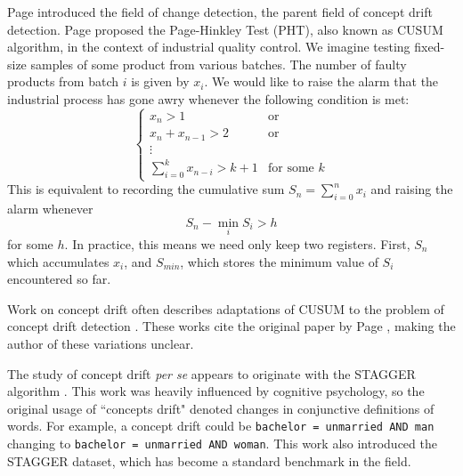 Page \cite{CUSUM} introduced the field of change detection, the parent field of concept drift detection. Page proposed the Page-Hinkley Test (PHT), also known as CUSUM algorithm, in the context of industrial quality control. We imagine testing fixed-size samples of some product from various batches. The number of faulty products from batch $i$ is given by $x_i$. We would like to raise the alarm that the industrial process has gone awry whenever the following condition is met:
\begin{equation}
    \begin{cases}
        x_n > 1 & \text{or} \\
        x_n + x_{n-1} > 2 & \text{or} \\
        \vdots \\
        \sum_{i=0}^k x_{n-i} > k + 1 & \text{for some $k$}
    \end{cases}
\end{equation}
This is equivalent to recording the cumulative sum $S_n = \sum_{i=0}^n x_i$ and raising the alarm whenever
\begin{equation}
    S_n - \min_{i} S_i > h
\end{equation}
for some $h$. In practice, this means we need only keep two registers. First, $S_n$ which accumulates $x_i$, and $S_{min}$, which stores the minimum value of $S_i$ encountered so far.


Work on concept drift often describes adaptations of CUSUM to the problem of concept drift detection \cite{barros_comparison}\cite{gama_survey}. These works cite the original paper by Page \cite{CUSUM}, making the author of these variations unclear. %

The study of concept drift {\it per se} appears to originate with the STAGGER algorithm \cite{STAGGER}. This work was heavily influenced by cognitive psychology, so the original usage of ``concepts drift" denoted changes in conjunctive definitions of words. For example, a concept drift could be {\tt bachelor = unmarried AND man} changing to {\tt bachelor = unmarried AND woman}. This work also introduced the STAGGER dataset, which has become a standard benchmark in the field. 

